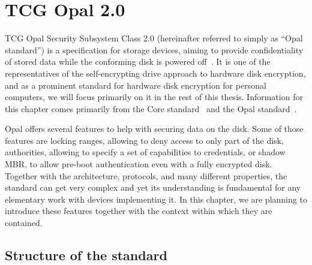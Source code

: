 \chapter{TCG Opal 2.0}
\label{chapter_opal}

TCG Opal Security Subsystem Class 2.0 (hereinafter referred to simply as ``Opal standard'') is a specification for storage devices, aiming to provide confidentiality of stored data while the conforming disk is powered off~\cite{tcg-opal2}. It is one of the representatives of the self-encrypting drive approach to hardware disk encryption, and as a prominent standard for hardware disk encryption for personal computers, we will focus primarily on it in the rest of this thesis.
Information for this chapter comes primarily from the Core standard~\cite{tcg-storage-core} and the Opal standard~\cite{tcg-opal2}.

Opal offers several features to help with securing data on the disk.
Some of those features are locking ranges, allowing to deny access to only part of the disk, authorities, allowing to specify a set of capabilities to credentials, or shadow MBR, to allow pre-boot authentication even with a fully encrypted disk. Together with the architecture, protocols, and many different properties, the standard can get very complex and yet its understanding is fundamental for any elementary work with devices implementing it.
In this chapter, we are planning to introduce these features together with the context within which they are contained.



\section{Structure of the standard}

